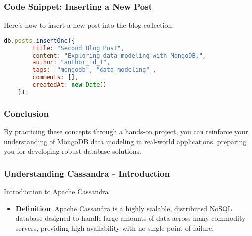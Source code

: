 \documentclass[aspectratio=169]{beamer}
\begin{document}
\begin{frame}[fragile]
    \frametitle{Code Snippet: Inserting a New Post}
    Here’s how to insert a new post into the blog collection:
    \begin{lstlisting}[language=javascript]
    db.posts.insertOne({
        title: "Second Blog Post",
        content: "Exploring data modeling with MongoDB.",
        author: "author_id_1",
        tags: ["mongodb", "data-modeling"],
        comments: [],
        createdAt: new Date()
    });
    \end{lstlisting}
\end{frame}

\begin{frame}
    \frametitle{Conclusion}
    By practicing these concepts through a hands-on project, you can reinforce your understanding of MongoDB data modeling in real-world applications, preparing you for developing robust database solutions.
\end{frame}

\begin{frame}[fragile]
    \frametitle{Understanding Cassandra - Introduction}
    \begin{block}{Introduction to Apache Cassandra}
        \begin{itemize}
            \item \textbf{Definition}: Apache Cassandra is a highly scalable, distributed NoSQL database designed to handle large amounts of data across many commodity servers, providing high availability with no single point of failure.
        \end{itemize}
    \end{block}
\end{frame}
\end{document}

